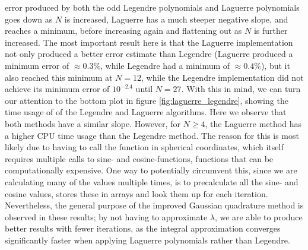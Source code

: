 \documentclass[a4paper,10pt,english]{article}
\begin{document}
error produced by both the odd Legendre polynomials and Laguerre polynomials goes down as $N$ is increased, Laguerre has a much steeper negative slope, and reaches a minimum, before increasing again and flattening out as $N$ is further increased. The most important result here is that the Laguerre implementation not only produced a better error estimate than Legendre (Laguerre produced a minimum error of $\approx 0.3\%$, while Legendre had a minimum of $\approx 0.4 \%$), but it also reached this minimum at $N = 12$, while the Legendre implementation did not achieve its minimum error of $10^{-2.4}$ until $N=27$. With this in mind, we can turn our attention to the bottom plot in figure \ref{fig:laguerre_legendre}, showing the time usage of of the Legendre and Laguerre algorithms. Here we observe that both methods have a similar slope. However, for $N \geq 4$, the Laguerre method has a higher CPU time usage than the Legendre method. The reason for this is most likely due to having to call the function in spherical coordinates, which itself requires multiple calls to sine- and cosine-functions, functions that can be computationally expensive. One way to potentially circumvent this, since we are calculating many of the values multiple times, is to precalculate all the sine- and cosine values, stores these in arrays and look them up for each iteration. Nevertheless, the general purpose of the improved Gaussian quadrature method is observed in these results; by not having to approximate $\lambda$, we are able to produce better results with fewer iterations, as the integral approximation converges significantly faster when applying Laguerre polynomials rather than Legendre. 
\end{document}
